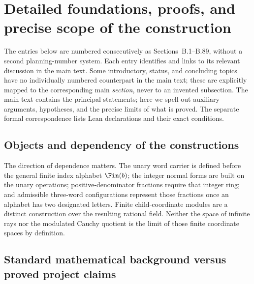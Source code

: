 \clearpage
\section{Detailed foundations, proofs, and precise scope of the construction}\label{app:longform}
The entries below are numbered consecutively as Sections~B.1--B.89, without a second planning-number system. Each entry identifies and links to its relevant discussion in the main text. Some introductory, status, and concluding topics have no individually numbered counterpart in the main text; these are explicitly mapped to the corresponding main \emph{section}, never to an invented subsection. The main text contains the principal statements; here we spell out auxiliary arguments, hypotheses, and the precise limits of what is proved. The separate formal correspondence lists Lean declarations and their exact conditions.

\subsection{Objects and dependency of the constructions}\label{supp:1-1}
\par{}\par\smallskip

The direction of dependence matters. The unary word carrier is defined before the general finite index alphabet $\Fin(b)$; the integer normal forms are built on the unary operations; positive-denominator fractions require that integer ring; and admissible three-word configurations represent those fractions once an alphabet has two designated letters. Finite child-coordinate modules are a distinct construction over the resulting rational field. Neither the space of infinite rays nor the modulated Cauchy quotient is the limit of those finite coordinate spaces by definition.

\subsection{Standard mathematical background versus proved project claims}\label{supp:1-2}
\par{}\par\smallskip

